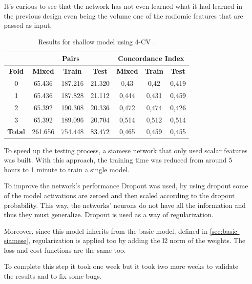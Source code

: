 It's curious to see that the network has not even learned what it had learned in the 
previous design even being the volume one of the radiomic features
that are passed as input.

\begin{table}
  \centering
  \begin{tabular}{|c||c|c|c||c|c|c|}
    \cline{2-7}
    \multicolumn{1}{c|}{} & \multicolumn{3}{|c||}{\textbf{Pairs}} & 
    \multicolumn{3}{c|}{\textbf{Concordance Index}} \\
    \hline
    \textbf{Fold} & \textbf{Mixed} & \textbf{Train} & \textbf{Test} & 
    \textbf{Mixed} & \textbf{Train} & \textbf{Test} \\
    \hhline{=======}
    0 & 65.436 & 187.216 & 21.320 & 0,43 & 0,42 & 0,419 \\
    1 & 65.436 & 187.828 & 21.112 & 0,444 & 0,431 & 0,459 \\
    2 & 65.392 & 190.308 & 20.336 & 0,472 & 0,474 & 0,426 \\
    3 & 65.392 & 189.096 & 20.704 & 0,514 & 0,512 & 0,514 \\
    \hhline{=======}
    \textbf{Total} & 261.656 & 754.448 & 83.472 & 0,465 & 0,459 & 0,455 \\
    \hline
  \end{tabular}

  \caption[Shallow 4-CV results]{
    Results for shallow model using 4-CV \label{tab:results-shallow-4CV}.
  }
\end{table}

\label{sec:scalar-only}

To speed up the testing process, a siamese network that only used scalar features 
was built. With this approach, the training time was reduced from around 5 hours 
to 1 minute to train a single model. 

To improve the network's performance Dropout \cite{neural:dropout} was used, by using 
dropout some of the model activations are zeroed and then scaled according to the 
dropout probability. This way, the networks' neurons do not have all the information and 
thus they must generalize. Dropout is used as a way of regularization. 

Moreover, since this model inherits from the basic model, defined in \autoref{sec:basic-siamese}, 
regularization is applied too by adding the l2 norm of the weights. The loss and
cost functions are the same too.

To complete this step it took one week but it took two more weeks to validate the results 
and to fix some bugs.

